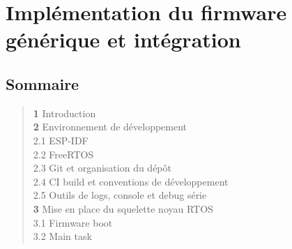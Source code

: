 \chapter{Implémentation du firmware générique et intégration}

\section*{Sommaire}
\begin{quote}
\small
\textbf{1} \hspace{1em} Introduction \dotfill \pageref{sec:intro_ch4}\\
\textbf{2} \hspace{1em} Environnement de développement \dotfill \pageref{sec:env_ch4}\\
\hspace{2.5em} 2.1 \hspace{0.5em} ESP-IDF \dotfill \pageref{subsec:espidf}\\
\hspace{2.5em} 2.2 \hspace{0.5em} FreeRTOS \dotfill \pageref{subsec:freertos}\\
\hspace{2.5em} 2.3 \hspace{0.5em} Git et organisation du dépôt \dotfill \pageref{subsec:git}\\
\hspace{2.5em} 2.4 \hspace{0.5em} CI build et conventions de développement \dotfill \pageref{subsec:ci}\\
\hspace{2.5em} 2.5 \hspace{0.5em} Outils de logs, console et debug série \dotfill \pageref{subsec:debug}\\
\textbf{3} \hspace{1em} Mise en place du squelette noyau RTOS \dotfill \pageref{sec:skeleton}\\
\hspace{2.5em} 3.1 \hspace{0.5em} Firmware boot \dotfill \pageref{subsec:boot}\\
\hspace{2.5em} 3.2 \hspace{0.5em} Main task \dotfill \pageref{subsec:maintask}\\

\end{quote}
